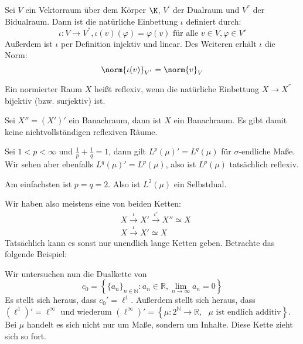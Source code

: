 \begin{definition} \label{nat_einb} 
	Sei $V$ ein Vektorraum über dem Körper $\K$, $V^{'}$ der Dualraum und $V^{''}$ der Bidualraum. Dann ist die natürliche Einbettung $\iota$ definiert durch: 
	\[
	\iota: V \to V^{''}, \iota(v)(\varphi) = \varphi(v) \text{ für alle } v \in V, \varphi \in V'
	\]
	Außerdem ist $\iota$ per Definition injektiv und linear. Des Weiteren erhält $\iota$ die Norm:
	\[
	\norm{\iota(v)}_{V^{'}} = \norm{v}_V
	\]
\end{definition}

\begin{definition} 
	Ein normierter Raum $X$ heißt reflexiv, wenn die natürliche Einbettung $X \to X^{''}$ bijektiv (bzw. surjektiv) ist.
\end{definition}

\begin{rem} 
	Sei $X'' = (X')'$ ein Banachraum, dann ist $X$ ein Banachraum. Es gibt damit keine nichtvollständigen reflexiven Räume.
\end{rem}

\begin{ex} 
	Sei $1 < p < \infty$ und $\frac{1}{p}+\frac{1}{q} = 1$, dann gilt $L^p(\mu)' = L^q(\mu)$ für $\sigma$-endliche Maße. Wir sehen aber ebenfalls $L^q(\mu)' = L^p(\mu)$, also ist $L^p(\mu)$ tatsächlich reflexiv.
	
	Am einfachsten ist $p = q = 2$. Also ist $L^2(\mu)$ ein Selbstdual.
\end{ex}

\begin{rem} 
	Wir haben also meistens eine von beiden Ketten:
	\begin{align*}
		& X \xrightarrow{\iota} X' \xrightarrow{\iota'} X'' \simeq X \\
		& X \xrightarrow{\iota} X' \simeq X
	\end{align*}
	Tatsächlich kann es sonst nur unendlich lange Ketten geben. Betrachte das folgende Beispiel:
\end{rem}

\begin{ex} 
	Wir untersuchen nun die Dualkette von 
	\[
	c_0 = \left\{ \{a_n\}_{n \in \mathbb{N}} : a_n \in \mathbb{R}, \lim_{n \to \infty} a_n = 0 \right\}
	\]
	Es stellt sich heraus, dass $c_0' = \ell^1$. Außerdem stellt sich heraus, dass $(\ell^1)' = \ell^{\infty}$ und wiederum $(\ell^{\infty})' = \left\{ \mu : 2^{\mathbb{N}} \to \mathbb{R}, \text{ $\mu $ ist endlich additiv} \right\}$. Bei $\mu$ handelt es sich nicht nur um Maße, sondern um Inhalte. Diese Kette zieht sich so fort.
\end{ex}

